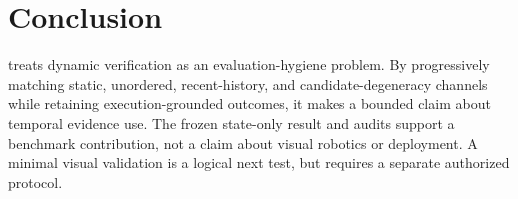 \section{Conclusion}
\bench treats dynamic verification as an evaluation-hygiene problem. By progressively matching static, unordered, recent-history, and candidate-degeneracy channels while retaining execution-grounded outcomes, it makes a bounded claim about temporal evidence use. The frozen state-only result and audits support a benchmark contribution, not a claim about visual robotics or deployment. A minimal visual validation is a logical next test, but requires a separate authorized protocol.
